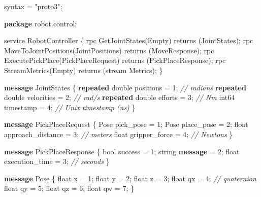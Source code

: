 \documentclass[
]{article}
\newenvironment{Shaded}{\begin{snugshade}}{\end{snugshade}}
\newcommand{\CommentTok}[1]{\textcolor[rgb]{0.56,0.35,0.01}{\textit{#1}}}
\newcommand{\DataTypeTok}[1]{\textcolor[rgb]{0.13,0.29,0.53}{#1}}
\newcommand{\DecValTok}[1]{\textcolor[rgb]{0.00,0.00,0.81}{#1}}
\newcommand{\KeywordTok}[1]{\textcolor[rgb]{0.13,0.29,0.53}{\textbf{#1}}}
\newcommand{\NormalTok}[1]{#1}
\newcommand{\StringTok}[1]{\textcolor[rgb]{0.31,0.60,0.02}{#1}}
\begin{document}
\begin{Shaded}
\begin{Highlighting}[]
\NormalTok{syntax = }\StringTok{"proto3"}\NormalTok{;}

\KeywordTok{package}\NormalTok{ robot.control;}

\NormalTok{service RobotController \{}
\NormalTok{  rpc GetJointStates(Empty) returns (JointStates);}
\NormalTok{  rpc MoveToJointPositions(JointPositions) returns (MoveResponse);}
\NormalTok{  rpc ExecutePickPlace(PickPlaceRequest) returns (PickPlaceResponse);}
\NormalTok{  rpc StreamMetrics(Empty) returns (stream Metrics);}
\NormalTok{\}}

\KeywordTok{message}\NormalTok{ JointStates \{}
  \KeywordTok{repeated} \DataTypeTok{double}\NormalTok{ positions = }\DecValTok{1}\NormalTok{;  }\CommentTok{// radians}
  \KeywordTok{repeated} \DataTypeTok{double}\NormalTok{ velocities = }\DecValTok{2}\NormalTok{;  }\CommentTok{// rad/s}
  \KeywordTok{repeated} \DataTypeTok{double}\NormalTok{ efforts = }\DecValTok{3}\NormalTok{;  }\CommentTok{// Nm}
  \DataTypeTok{int64}\NormalTok{ timestamp = }\DecValTok{4}\NormalTok{;  }\CommentTok{// Unix timestamp (ns)}
\NormalTok{\}}

\KeywordTok{message}\NormalTok{ PickPlaceRequest \{}
\NormalTok{  Pose pick\_pose = }\DecValTok{1}\NormalTok{;}
\NormalTok{  Pose place\_pose = }\DecValTok{2}\NormalTok{;}
  \DataTypeTok{float}\NormalTok{ approach\_distance = }\DecValTok{3}\NormalTok{;  }\CommentTok{// meters}
  \DataTypeTok{float}\NormalTok{ gripper\_force = }\DecValTok{4}\NormalTok{;  }\CommentTok{// Newtons}
\NormalTok{\}}

\KeywordTok{message}\NormalTok{ PickPlaceResponse \{}
  \DataTypeTok{bool}\NormalTok{ success = }\DecValTok{1}\NormalTok{;}
  \DataTypeTok{string} \KeywordTok{message}\NormalTok{ = }\DecValTok{2}\NormalTok{;}
  \DataTypeTok{float}\NormalTok{ execution\_time = }\DecValTok{3}\NormalTok{;  }\CommentTok{// seconds}
\NormalTok{\}}

\KeywordTok{message}\NormalTok{ Pose \{}
  \DataTypeTok{float}\NormalTok{ x = }\DecValTok{1}\NormalTok{;}
  \DataTypeTok{float}\NormalTok{ y = }\DecValTok{2}\NormalTok{;}
  \DataTypeTok{float}\NormalTok{ z = }\DecValTok{3}\NormalTok{;}
  \DataTypeTok{float}\NormalTok{ qx = }\DecValTok{4}\NormalTok{;  }\CommentTok{// quaternion}
  \DataTypeTok{float}\NormalTok{ qy = }\DecValTok{5}\NormalTok{;}
  \DataTypeTok{float}\NormalTok{ qz = }\DecValTok{6}\NormalTok{;}
  \DataTypeTok{float}\NormalTok{ qw = }\DecValTok{7}\NormalTok{;}
\NormalTok{\}}
\end{Highlighting}
\end{Shaded}
\end{document}
